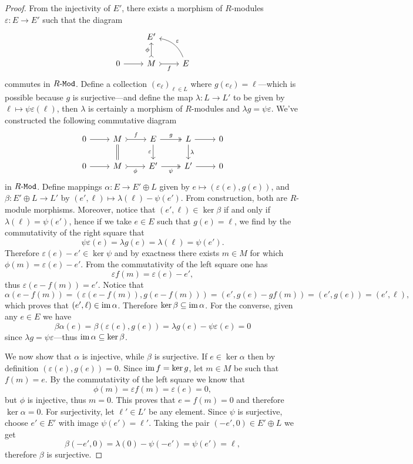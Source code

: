 \begin{proof}
From the injectivity of \(E'\), there exists a morphism of \(R\)-modules
\(\varepsilon: E \to E'\) such that the diagram
\[
\begin{tikzcd}
&E' & \\
0 \ar[r]
&M \ar[u, tail, "\phi"] \ar[r, tail, "f"']
&E \ar[ul, bend right, "\varepsilon"']
\end{tikzcd}
\]
commutes in \({R\text{-}\texttt{Mod}}\). Define a collection \((e_{\ell})_{\ell \in L}\) where
\(g(e_{\ell}) = \ell\)---which is possible because \(g\) is surjective---and
define the map \(\lambda: L \to L'\) to be given by
\(\ell \mapsto \psi \varepsilon(\ell)\), then \(\lambda\) is certainly a
morphism of \(R\)-modules and \(\lambda g = \psi \varepsilon\). We've
constructed the following commutative diagram
\[
\begin{tikzcd}
0 \ar[r]
&M \ar[d, equals] \ar[r, tail, "f"]
&E \ar[r, two heads, "g"] \ar[d, "\varepsilon"']
&L \ar[r] \ar[d, "\lambda"] &0
\\
0 \ar[r] &M \ar[r, tail, "\phi"'] &E' \ar[r, two heads, "\psi"'] &L' \ar[r] &0
\end{tikzcd}
\]
in \({R\text{-}\texttt{Mod}}\). Define mappings \(\alpha: E \to E' \oplus L\) given by
\(e \mapsto (\varepsilon(e), g(e))\), and \(\beta: E' \oplus L \to L'\) by
\((e', \ell) \mapsto \lambda(\ell) - \psi(e')\). From construction, both are
\(R\)-module morphisms. Moreover, notice that \((e', \ell) \in \ker \beta\) if
and only if \(\lambda(\ell) = \psi(e')\), hence if we take \(e \in E\) such that
\(g(e) = \ell\), we find by the commutativity of the right square that
\[
\psi \varepsilon(e) = \lambda g(e) = \lambda(\ell) = \psi(e').
\]
Therefore \(\varepsilon(e) - e' \in \ker \psi\) and by exactness there exists
\(m \in M\) for which \(\phi(m) = \varepsilon(e) - e'\). From the commutativity
of the left square one has
\[
\varepsilon f(m) = \varepsilon(e) - e',
\]
thus \(\varepsilon(e - f(m)) = e'\). Notice that
\[
\alpha(e - f(m)) = (\varepsilon(e - f(m)), g(e - f(m)))
= (e', g(e) - g f(m))
= (e', g(e))
= (e', \ell),
\]
which proves that \((e', \ell) \in \operatorname{im} \alpha\). Therefore
\(\ker \beta \subseteq \operatorname{im} \alpha\). For the converse, given any \(e \in E\) we have
\[
\beta \alpha(e) = \beta(\varepsilon(e), g(e))
= \lambda g(e) - \psi \varepsilon(e)
= 0
\]
since \(\lambda g = \psi \varepsilon\)---thus
\(\operatorname{im} \alpha \subseteq \ker \beta\).

We now show that \(\alpha\) is injective, while
\(\beta\) is surjective. If \(e \in \ker \alpha\) then by definition
\((\varepsilon(e), g(e)) = 0\). Since \(\operatorname{im} f = \ker g\), let \(m \in M\) be
such that \(f(m) = e\). By the commutativity of the left square we know that
\[
\phi(m) = \varepsilon f(m) = \varepsilon(e) = 0,
\]
but \(\phi\) is injective, thus \(m = 0\). This proves that \(e = f(m) = 0\) and
therefore \(\ker \alpha = 0\). For surjectivity, let \(\ell' \in L'\) be any
element. Since \(\psi\) is surjective, choose \(e' \in E'\) with image
\(\psi(e') = \ell'\). Taking the pair \((-e', 0) \in E' \oplus L\) we get
\[
\beta(-e', 0) = \lambda(0) - \psi(-e') = \psi(e') = \ell,
\]
therefore \(\beta\) is surjective.


\end{proof}
